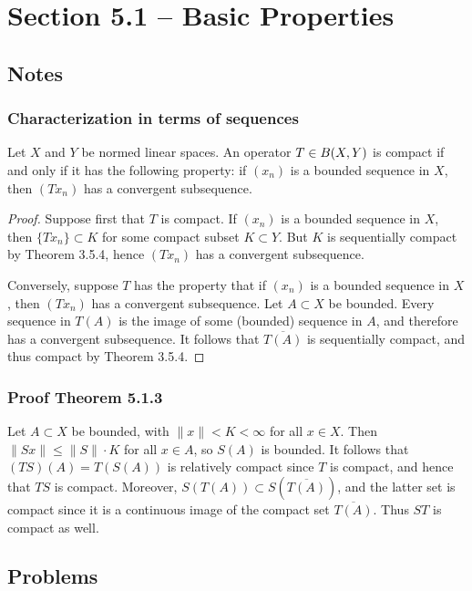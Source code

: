 \documentclass{report}
\newcommand{\norm}[1]{{\lVert #1 \rVert}}
\let\sc\relax
\newcommand{\sc}[1]{\mathscr{#1}}
\theoremstyle{remark}
\begin{document}
\section*{Section 5.1 -- Basic Properties}

\subsection*{Notes}

\subsubsection*{Characterization in terms of sequences}
Let $X$ and $Y$ be normed linear spaces. An operator $T \in \sc B(X,Y)$ is compact if and only if it has the following property: if $(x_n)$ is a bounded sequence in $X$, then $(Tx_n)$ has a convergent subsequence.

\begin{proof}
  Suppose first that $T$ is compact. If $(x_n)$ is a bounded sequence in $X$, then $\{Tx_n\} \subset K$ for some compact subset $K \subset Y$. But $K$ is sequentially compact by Theorem 3.5.4, hence $(Tx_n)$ has a convergent subsequence.

  Conversely, suppose $T$ has the property that if $(x_n)$ is a bounded sequence in $X$, then $(Tx_n)$ has a convergent subsequence. Let $A \subset X$ be bounded. Every sequence in $T(A)$ is the image of some (bounded) sequence in $A$, and therefore has a convergent subsequence. It follows that $\overline{T(A)}$ is sequentially compact, and thus compact by Theorem 3.5.4.
\end{proof}

\subsubsection*{Proof Theorem 5.1.3}
Let $A \subset X$ be bounded, with $\norm x < K < \infty$ for all $x \in X$. Then $\norm{Sx} \le \norm S \cdot K$ for all $x \in A$, so $S(A)$ is bounded. It follows that $(TS)(A) = T(S(A))$ is relatively compact since $T$ is compact, and hence that $TS$ is compact. Moreover, $S(T(A)) \subset S(\overline{T(A)})$, and the latter set is compact since it is a continuous image of the compact set $\overline{T(A)}$. Thus $ST$ is compact as well.

\subsection*{Problems}
\end{document}

